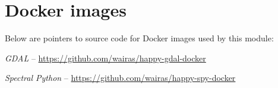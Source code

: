 \documentclass[a4paper]{book}
\begin{document}
\chapter{Docker images}
Below are pointers to source code for Docker images used by this module:
\begin{tight_itemize}
  \item \textit{GDAL} -- \url{https://github.com/wairas/happy-gdal-docker}{}
  \item \textit{Spectral Python} -- \url{https://github.com/wairas/happy-spy-docker}{}
\end{tight_itemize}


\end{document}
